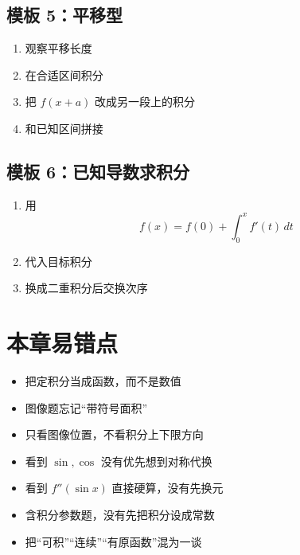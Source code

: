 \documentclass[12pt,a4paper]{ctexart}
\begin{document}
\subsection*{模板 5：平移型}
\begin{enumerate}
  \item 观察平移长度
  \item 在合适区间积分
  \item 把 $f(x+a)$ 改成另一段上的积分
  \item 和已知区间拼接
\end{enumerate}

\subsection*{模板 6：已知导数求积分}
\begin{enumerate}
  \item 用
  \[
  f(x)=f(0)+\int_0^x f'(t)\,dt
  \]
  \item 代入目标积分
  \item 换成二重积分后交换次序
\end{enumerate}

\section{本章易错点}

\begin{itemize}
  \item 把定积分当成函数，而不是数值
  \item 图像题忘记“带符号面积”
  \item 只看图像位置，不看积分上下限方向
  \item 看到 $\sin,\cos$ 没有优先想到对称代换
  \item 看到 $f''(\sin x)$ 直接硬算，没有先换元
  \item 含积分参数题，没有先把积分设成常数
  \item 把“可积”“连续”“有原函数”混为一谈
\end{itemize}
\end{document}
